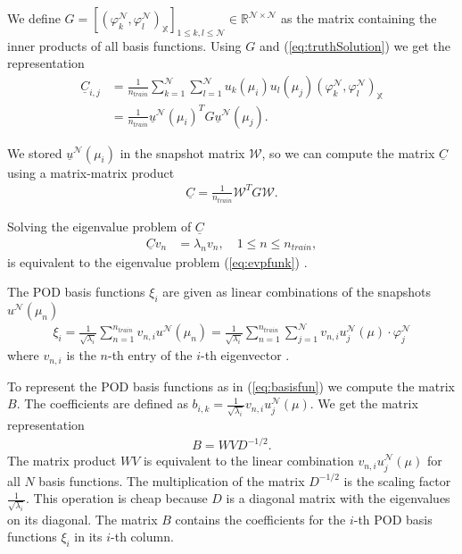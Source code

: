We define  $G=[(\varphi_k^\mathcal{ N },\varphi_l^\mathcal{ N })_\mathbb{X}]_{1\leq k,l \leq \mathcal{ N }} \in \mathbb{R}^{\mathcal{ N } \times \mathcal{ N }}$ as the matrix containing the inner products of all basis functions.
Using $G$ and (\ref{eq:truthSolution}) we get the representation
\begin{align*}
\underline{C}_{i,j} &=
\frac{1}{n_{train}} 
\sum_{k=1}^{\mathcal{ N }} \sum_{l=1}^{\mathcal{ N }} 
u_k(\mu_{i}) u_l(\mu_{j})
(\varphi_k^\mathcal{ N },\varphi_l^\mathcal{ N })_\mathbb{X}
\\ &=
\frac{1}{n_{train}} 
\underline{u}^{\mathcal{ N }}(\mu_{i})^T G \underline{u}^{\mathcal{ N }}(\mu_{j}).
\end{align*}

We stored $\underline{u}^{\mathcal{ N }}(\mu_{i})$ in the snapshot matrix $\mathcal{ W }$, so we can compute the matrix $\underline{C}$ using a matrix-matrix product
\begin{align*}
\underline{C} =
\frac{1}{n_{train}}
\mathcal{W}^T G \mathcal{W}.
\end{align*}


Solving the eigenvalue problem of $\underline{C}$ 
\begin{align*}
\underline{C} v_n &= \lambda_n v_n ,\quad 1 \leq n \leq n_{train} ,
\end{align*}
is equivalent to the eigenvalue problem (\ref{eq:evpfunk}) \cite[Section 3.2.1, Linear algebra box]{HRSbook}.

The POD basis functions $\xi_i$ are given as linear combinations of the snapshots $u^\mathcal{ N }(\mu_{n})$
\begin{align*}
\xi_i = 
\frac{1}{\sqrt{\lambda_{i}}} 
\sum_{n=1}^{n_{train}} 
v_{n,i} 
u^\mathcal{ N }(\mu_{n})
=
\frac{1}{\sqrt{\lambda_{i}}} 
\sum_{n=1}^{n_{train}}  
\sum_{j=1}^\mathcal{ N } 
v_{n,i}
u_j^\mathcal{ N } (\mu) \cdot \varphi_j^\mathcal{ N }
\end{align*}
where $v_{n,i}$ is the $n$-th entry of the $i$-th eigenvector \cite[Section 3.2.1, Linear algebra box]{HRSbook}.

To represent the POD basis functions as in (\ref{eq:basisfun}) we compute the matrix $B$. The coefficients are defined as $ b_{i,k} = \frac{1}{\sqrt{\lambda_{i}}} v_{n,i} u_j^\mathcal{ N } (\mu) $. We get the matrix representation
\begin{align*}
B = WVD^{-1/2}.
\end{align*}
The matrix product $WV$ is equivalent to the  linear combination $ v_{n,i} u_j^\mathcal{ N } (\mu) $ for all $N$ basis functions.
The multiplication of the matrix $D^{-1/2}$ is the scaling factor $ \frac{1}{\sqrt{\lambda_{i}}}$. This operation is cheap because $D$ is a diagonal matrix with the eigenvalues on its diagonal.
The matrix $B$ contains the coefficients for the $i$-th POD basis functions $\xi_i $ in its $i$-th column.

